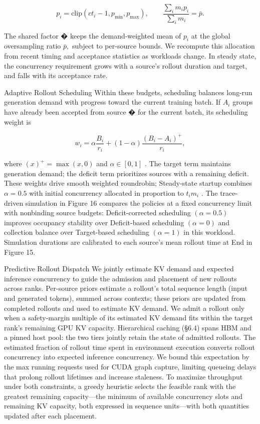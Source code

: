 \documentclass[
  10
]{article}
\begin{document}
\[
p _ {i} = \mathrm{clip} (c t _ {i} - 1, p _ {\min}, p _ {\max}), \qquad \frac {\sum_ {i} m _ {i} p _ {i}}{\sum_ {i} m _ {i}} = \bar {p}.\tag{6}
\]

The shared factor � keeps the demand-weighted mean of \(p _ { i }\) at
the global oversampling ratio \({ \bar { p } } ,\) subject to per-source
bounds. We recompute this allocation from recent timing and acceptance
statistics as workloads change. In steady state, the concurrency
requirement grows with a source's rollout duration and target, and falls
with its acceptance rate.

Adaptive Rollout Scheduling Within these budgets, scheduling balances
long-run generation demand with progress toward the current training
batch. If \(A _ { i }\) groups have already been accepted from source �
for the current batch, its scheduling weight is

\[
w _ {i} = \alpha \frac {B _ {i}}{r _ {i}} + (1 - \alpha) \frac {(B _ {i} - A _ {i}) ^ {+}}{r _ {i}},\tag{7}
\]

where \(( x ) ^ { + } = \operatorname* { m a x } ( x , 0 )\) and
\(\alpha \in [ 0 , 1 ]\) . The target term maintains generation demand;
the deficit term prioritizes sources with a remaining deficit. These
weights drive smooth weighted roundrobin; Steady-state startup combines
\(\alpha = 0 . 5\) with initial concurrency allocated in proportion to
\(t _ { i } m _ { i }\) . The trace-driven simulation in Figure 16
compares the policies at a fixed concurrency limit with nonbinding
source budgets: Deficit-corrected scheduling \(( \alpha = 0 . 5 )\)
improves occupancy stability over Deficit-based scheduling
\(\left( \alpha = 0 \right)\) and collection balance over Target-based
scheduling \(( \alpha = 1 )\) in this workload. Simulation durations are
calibrated to each source's mean rollout time at End in Figure 15.

Predictive Rollout Dispatch We jointly estimate KV demand and expected
inference concurrency to guide the admission and placement of new
rollouts across ranks. Per-source priors estimate a rollout's total
sequence length (input and generated tokens), summed across contexts;
these priors are updated from completed rollouts and used to estimate KV
demand. We admit a rollout only when a safety-margin multiple of its
estimated KV demand fits within the target rank's remaining GPU KV
capacity. Hierarchical caching (§6.4) spans HBM and a pinned host pool:
the two tiers jointly retain the state of admitted rollouts. The
estimated fraction of rollout time spent in environment execution
converts rollout concurrency into expected inference concurrency. We
bound this expectation by the max running requests used for CUDA graph
capture, limiting queueing delays that prolong rollout lifetimes and
increase staleness. To maximize throughput under both constraints, a
greedy heuristic selects the feasible rank with the greatest remaining
capacity---the minimum of available concurrency slots and remaining KV
capacity, both expressed in sequence units---with both quantities
updated after each placement.
\end{document}
